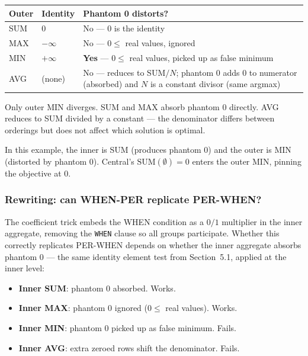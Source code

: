 \documentclass[11pt]{article}
\begin{document}
\begin{center}
\begin{tabular}{>{\raggedright\arraybackslash}p{}
                >{\raggedright\arraybackslash}p{}
                >{\raggedright\arraybackslash}p{}}
\toprule
\textbf{Outer} & \textbf{Identity} & \textbf{Phantom 0 distorts?} \\
\midrule
SUM & $0$ & No --- $0$ is the identity \\
MAX & $-\infty$ & No --- $0 \leq$ real values, ignored \\
MIN & $+\infty$ & \textbf{Yes} --- $0 \leq$ real values, picked up as false minimum \\
AVG & (none) & No --- reduces to SUM$/N$; phantom 0 adds 0 to numerator
    (absorbed) and $N$ is a constant divisor (same argmax) \\
\bottomrule
\end{tabular}
\end{center}

Only outer MIN diverges. SUM and MAX absorb phantom 0 directly. AVG
reduces to SUM divided by a constant --- the denominator differs between
orderings but does not affect which solution is optimal.

In this example, the inner is SUM (produces phantom 0) and the outer is
MIN (distorted by phantom 0). Central's $\text{SUM}(\emptyset) = 0$ enters
the outer MIN, pinning the objective at 0.

\subsubsection*{Rewriting: can WHEN-PER replicate PER-WHEN?}

The coefficient trick embeds the WHEN condition as a $0/1$ multiplier in
the inner aggregate, removing the \texttt{WHEN} clause so all groups
participate. Whether this correctly replicates PER-WHEN depends on whether
the inner aggregate absorbs phantom 0 --- the same identity element test
from Section~5.1, applied at the inner level:

\begin{itemize}[leftmargin=2em]
    \item \textbf{Inner SUM}: phantom 0 absorbed. Works.
    \item \textbf{Inner MAX}: phantom 0 ignored ($0 \leq$ real values). Works.
    \item \textbf{Inner MIN}: phantom 0 picked up as false minimum. Fails.
    \item \textbf{Inner AVG}: extra zeroed rows shift the denominator. Fails.
\end{itemize}
\end{document}

